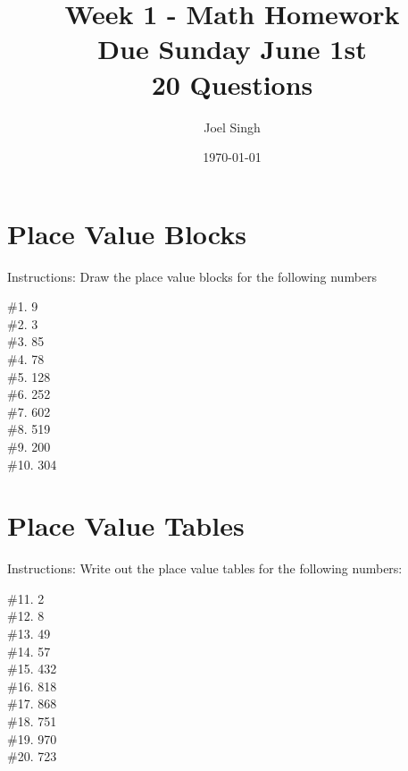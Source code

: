 \documentclass{article}
\title{Week 1 - Math Homework \\ Due Sunday June 1st \\ 20 Questions}
\author{Joel Singh}
\date{\today}
\begin{document}
\maketitle

\section{Place Value Blocks}
Instructions: Draw the place value blocks for the following numbers

\#1. 9 \vspace{2in} \\
\#2. 3 \vspace{2in} \\
\#3. 85 \vspace{2in} \\
\#4. 78 \vspace{2in} \\
\#5. 128 \vspace{2in} \\
\#6. 252 \vspace{2in} \\
\#7. 602 \vspace{2in} \\
\#8. 519 \vspace{2in} \\
\#9. 200 \vspace{2in} \\
\#10. 304 \vspace{2in} \\

\section{Place Value Tables}
Instructions: Write out the place value tables for the following numbers:

\#11. 2 \vspace{2in} \\
\#12. 8 \vspace{2in} \\
\#13. 49 \vspace{2in} \\
\#14. 57 \vspace{2in} \\
\#15. 432 \vspace{2in} \\
\#16. 818 \vspace{2in} \\
\#17. 868 \vspace{2in} \\
\#18. 751 \vspace{2in} \\
\#19. 970 \vspace{2in} \\
\#20. 723 \vspace{2in} \\
\end{document}
